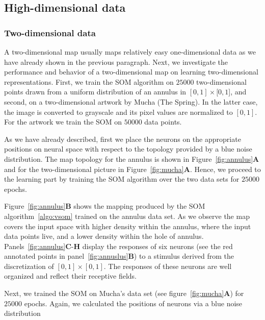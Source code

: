 \subsection{High-dimensional data}

\subsubsection{Two-dimensional data}

A two-dimensional map usually maps relatively easy one-dimensional data as 
we have already shown in the previous paragraph. Next, we investigate the
performance and behavior of a two-dimensional map on learning two-dimensional
representations. First, we train the SOM algorithm on $25000$ two-dimensional 
points drawn from a uniform distribution of an annulus in $[0, 1]\times[0, 1$],
and second, on a two-dimensional artwork by Mucha (The Spring). In the latter
case, the image is converted to grayscale and its pixel values are normalized
to $[0, 1]$. For the artwork we train the SOM on $50000$ data points. 

As we have already described, first we place the neurons on the appropriate
positions on neural space with respect to the topology provided by a blue noise
distribution. The map topology for the annulus is shown in
Figure~\ref{fig:annulus}{\bfseries \sffamily A} and for the two-dimensional
picture in Figure~\ref{fig:mucha}{\bfseries \sffamily A}. Hence, we proceed to
the learning part by training the SOM algorithm over the two data sets for 
$25000$ epochs.

Figure~\ref{fig:annulus}{\bfseries \sffamily B} shows the mapping produced by
the SOM algorithm~\ref{algo:vsom} trained on the annulus data set. As we
observe the map covers the input space with higher density within the annulus,
where the input data points live, and a lower density within the hole of
annulus. Panels~\ref{fig:annulus}{\bfseries \sffamily C}-{\bfseries \sffamily H}
display the responses of six neurons (see the red annotated points in
panel~\ref{fig:annuslus}{\bfseries \sffamily B}) to a stimulus derived from 
the discretization of $[0, 1]\times [0, 1]$. The responses of these neurons
are well organized and reflect their receptive fields.

Next, we trained the SOM on Mucha's data set (see 
figure~\ref{fig:mucha}{\bfseries \sffamily A}) for $25000$ epochs. Again, we
calculated the positions of neurons via a blue noise distribution 

